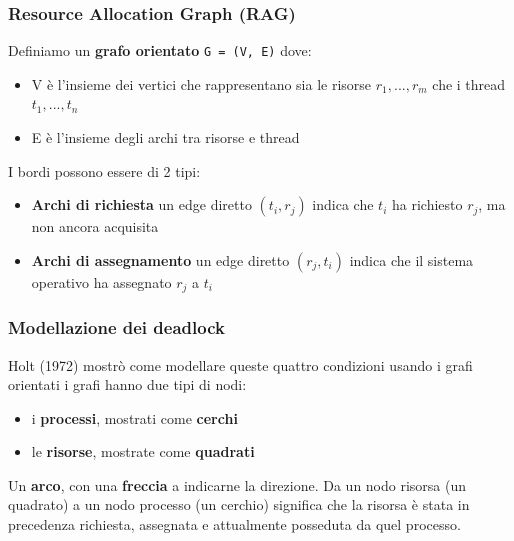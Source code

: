 \documentclass{article}
\begin{document}
\subsubsection{Resource Allocation Graph (RAG)}
Definiamo un \textbf{grafo orientato} \texttt{G = (V, E)} dove:
\begin{itemize}
    \item V è l'insieme dei vertici che rappresentano sia le risorse {$r_{1}, ..., r_{m}$} che i thread {$t_{1}, ..., t_{n}$}
    \item E è l'insieme degli archi tra risorse e thread
\end{itemize}
I bordi possono essere di 2 tipi:
\begin{itemize}
        \item \textbf{Archi di richiesta} un edge diretto $(t_{i}, r_{j})$ indica che $t_{i}$ ha richiesto $r_{j}$, ma non ancora acquisita
        \item \textbf{Archi di assegnamento} un edge diretto $(r_{j}, t_{i})$ indica che il sistema operativo ha assegnato $r_{j}$ a $t_{i}$
\end{itemize}
    

\subsubsection{Modellazione dei deadlock}
Holt (1972) mostrò come modellare queste quattro condizioni usando i grafi orientati i grafi hanno due tipi di nodi: 
\begin{itemize}
    \item i \textbf{processi}, mostrati come \textbf{cerchi}
    \item le \textbf{risorse}, mostrate come \textbf{quadrati}
\end{itemize}
Un \textbf{arco}, con una \textbf{freccia} a indicarne la direzione. Da un nodo risorsa (un quadrato) a un nodo processo (un cerchio) significa che la risorsa è stata in precedenza richiesta, assegnata e attualmente posseduta da quel processo.

\pagebreak
\end{document}

